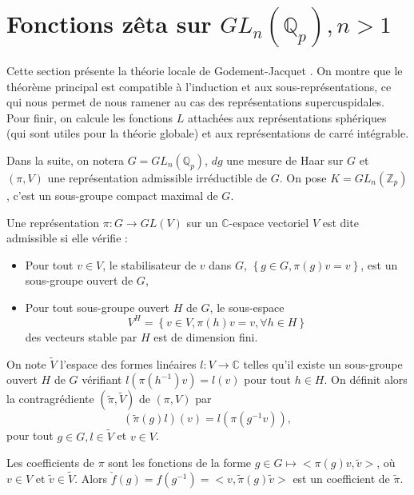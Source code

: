 \section{Fonctions zêta sur $GL_n(\mathbb{Q}_p), n > 1$}

\label{gln}
Cette section présente la théorie locale de Godement-Jacquet \cite{godement-jacquet}. On montre que le théorème principal est compatible à l'induction et aux sous-représentations, ce qui nous permet de nous ramener au cas des représentations supercuspidales. Pour finir, on calcule les fonctions $L$ attachées aux représentations sphériques (qui sont utiles pour la théorie globale) et aux représentations de carré intégrable.

Dans la suite, on notera $G = GL_n(\mathbb{Q}_p)$, $dg$ une mesure de Haar sur $G$ et $(\pi, V)$ une représentation admissible irréductible de $G$. On pose $K=GL_n(\mathbb{Z}_p)$, c'est un sous-groupe compact maximal de $G$.

\begin{definition}
Une représentation $\pi : G \rightarrow GL(V)$ sur un $\mathbb{C}$-espace vectoriel $V$ est dite admissible si elle vérifie :
\begin{itemize}
\item Pour tout $v \in V$, le stabilisateur de $v$ dans $G$, $\left\lbrace g \in G, \pi(g)v = v \right\rbrace$, est un sous-groupe ouvert de $G$,
\item Pour tout sous-groupe ouvert $H$ de $G$, le sous-espace
\begin{equation*}
V^H=\left\lbrace v \in V, \pi(h)v = v, \forall h \in H \right\rbrace
\end{equation*}
des vecteurs stable par $H$ est de dimension fini.
\end{itemize}
\end{definition}

\begin{definition}
On note $\tilde{V}$ l'espace des formes linéaires $l : V \rightarrow \mathbb{C}$ telles qu'il existe un sous-groupe ouvert $H$ de $G$ vérifiant $l(\pi(h^{-1})v)=l(v)$ pour tout $h \in H$. On définit alors la contragrédiente $(\tilde{\pi}, \tilde{V})$ de $(\pi, V)$ par
\begin{equation}
(\tilde{\pi}(g)l)(v) = l(\pi(g^{-1}v)),
\end{equation}
pour tout $g \in G, l \in \tilde{V}$ et $v \in V$.
\end{definition}

Les coefficients de $\pi$ sont les fonctions de la forme $g \in G \mapsto <\pi(g)v, \tilde{v}>$, où $v \in V$ et $\tilde{v} \in \tilde{V}$. Alors $\check{f}(g)=f(g^{-1})=<v, \tilde{\pi}(g)\tilde{v}>$ est un coefficient de $\tilde{\pi}$.

